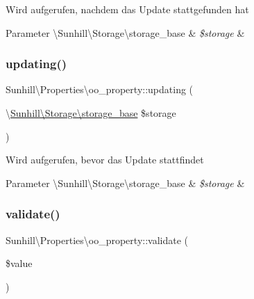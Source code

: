 Wird aufgerufen, nachdem das Update stattgefunden hat 
\begin{DoxyParams}[1]{Parameter}
\textbackslash{}\+Sunhill\textbackslash{}\+Storage\textbackslash{}storage\+\_\+base & {\em \$storage} & \\
\hline
\end{DoxyParams}
\mbox{\label{classSunhill_1_1Properties_1_1oo__property_a4e9144360e1f57e6d06c230469a9e039}} 
\subsubsection{\texorpdfstring{updating()}{updating()}}
{\footnotesize\ttfamily Sunhill\textbackslash{}\+Properties\textbackslash{}oo\+\_\+property\+::updating (\begin{DoxyParamCaption}\item[{\textbackslash{}\hyperlink{classSunhill_1_1Storage_1_1storage__base}{Sunhill\textbackslash{}\+Storage\textbackslash{}storage\+\_\+base}}]{\$storage }\end{DoxyParamCaption})}

Wird aufgerufen, bevor das Update stattfindet 
\begin{DoxyParams}[1]{Parameter}
\textbackslash{}\+Sunhill\textbackslash{}\+Storage\textbackslash{}storage\+\_\+base & {\em \$storage} & \\
\hline
\end{DoxyParams}
\mbox{\label{classSunhill_1_1Properties_1_1oo__property_a0b28ea2b83316460888cd440873d48a6}} 
\subsubsection{\texorpdfstring{validate()}{validate()}}
{\footnotesize\ttfamily Sunhill\textbackslash{}\+Properties\textbackslash{}oo\+\_\+property\+::validate (\begin{DoxyParamCaption}\item[{}]{\$value }\end{DoxyParamCaption})\hspace{0.3cm}{\ttfamily [protected]}}

